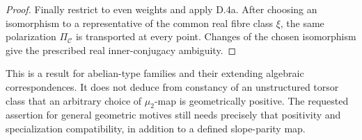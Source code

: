\begin{proof}
Finally restrict to even weights and apply D.4a.
After choosing an isomorphism to a representative
of the common real fibre class $\xi$, the same
polarization $\Pi_{\mathcal C}$ is transported at
every point. Changes of the chosen isomorphism give
the prescribed real inner-conjugacy ambiguity.
\end{proof}

This is a result for abelian-type families and their
extending algebraic correspondences. It does not
deduce from constancy of an unstructured torsor
class that an arbitrary choice of $\mu_2$-map is
geometrically positive. The requested assertion for
general geometric motives still needs precisely
that positivity and specialization compatibility,
in addition to a defined slope-parity map.
